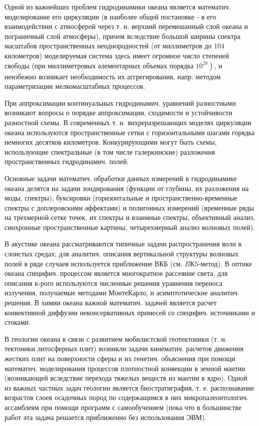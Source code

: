 \documentclass[10pt]{article}
\begin{document}
Одной из важнейших проблем гидродинамики океана является математич. моделирование его циркуляции (в наиболее общей постановке - в его взаимодействии с атмосферой через т. н. верхний перемешанный слой океана и пограничный слой атмосферы), причем вследствие большой ширины спектра масштабов пространственных неоднородностей (от миллиметров до 104 километров) моделируемая система здесь имеет огромное число степеней свободы (при миллиметровых әлементарных объемах порядка $\left.10^{28}\right)$, и неизбежно возникает необходимость их аггрегирования, напр. методом параметризации мелкомасштабных процессов.



При аппроксимации континуальных гидродинамич. уравнений разностными возникают вопросы о порядке аппроксимации, сходимости и устойчивости разностной схемы. В современных т. н. вихреразрешающих моделях циркуляции океана используются пространственные сетки с горизонтальными шагами горядка немногих десятков километров. Конкурирующими могут быть схемы, использующие спектральные (в том числе галеркинские) разложения пространственных гидродинамич. полей.



Основные задачи математич. обработки данных измерений в гидродинамике океана делятся на задачи зондирования (функции от глубины, их разложения на моды, спектры), буксировки (горизонтальные и пространственно-временные спектры с доплеровскими әффектами) и полигонных измерений (временные ряды на трехмерной сетке точек, их спектры и взаимные спектры, объективный анализ, синхронные пространственные картины, четырехмерный анализ волновых полей).



В акустике океана рассматриваются типичные задачи распространения волн в слоистых средах; для аналитич. описания вертикальной структуры волновых полей в ряде случаев используется приближение ВКБ (см. $B К 5$-метод). В оптике океана специфич. процессом является многократное рассеяние света, для описания к-рого используются численные решения уравнения переноса излучения, получаемые методами МонтеКарло, и асимптотические аналитич. решения. В химии океана важной математич. задачей является расчет конвективной диффузии неконсервативных примесей со специфич. источниками и стоками.



В геологии океана в связи с развитием мобилистской геотектоники (т. н. тектоники литосферных плит) возникли задачи кинематич. расчетов движения жестких плит на поверхности сферы и их генетич. объяснения при помощи математич. моделирования процессов плотностной конвекции в земной мантии (возникающей вследствие перехода тяжелых веществ из мантии в ядро). Одной из важных частных задач геологии является биостратиграфия, т. е. распознавание возрастов слоев осадочных пород по содержащимся в них микропалеонтологич. ассамблеям при помощи программ с самообучением (пока что в большинстве работ әта задача решается приближенно без использования ЭВМ).
\end{document}
